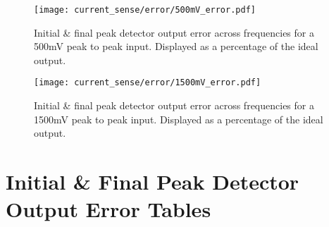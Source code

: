 \begin{figure}[H]
    \begin{center}
        \texttt{[image: current\_sense/error/500mV\_error.pdf]}
        \caption{Initial \& final peak detector output error across frequencies for a 500mV peak to peak input. Displayed as a percentage of the ideal output.}
    \end{center}
    \vspace{-20pt}
\end{figure}

\begin{figure}[H]
    \begin{center}
        \texttt{[image: current\_sense/error/1500mV\_error.pdf]}
        \caption{Initial \& final peak detector output error across frequencies for a 1500mV peak to peak input. Displayed as a percentage of the ideal output.}
    \end{center}
\end{figure}


\newpage
\section{Initial \& Final Peak Detector Output Error Tables}\label{A:peak_detector_tables}


